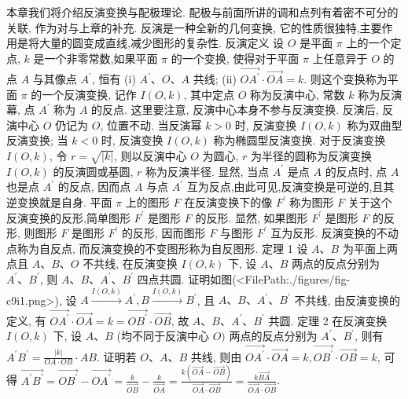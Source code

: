 
本章我们将介绍反演变换与配极理论.
配极与前面所讲的调和点列有着密不可分的关联, 作为对与上章的补充.
反演是一种全新的几何变换, 它的性质很独特,主要作用是将大量的圆变成直线,减少图形的复杂性.
反演定义 设 $O$ 是平面 $\pi$ 上的一个定点, $k$ 是一个非零常数,如果平面 $\pi$ 的一个变换, 使得对于平面 $\pi$ 上任意异于 $O$ 的点 $A$ 与其像点 $A^{\prime}$, 恒有
(i) $A^{\prime} 、 O 、 A$ 共线;
(ii) $\overrightarrow{O A^{\prime}} \cdot \overrightarrow{O A}=k$.
则这个变换称为平面 $\pi$ 的一个反演变换, 记作 $I(O, k)$, 其中定点 $O$ 称为反演中心, 常数 $k$ 称为反演幕, 点 $A^{\prime}$ 称为 $A$ 的反点.
这里要注意, 反演中心本身不参与反演变换.
反演后, 反演中心 $O$ 仍记为 $O$, 位置不动.
当反演幂 $k>0$ 时, 反演变换 $I(O, k)$ 称为双曲型反演变换; 当 $k<0$ 时, 反演变换 $I(O, k)$ 称为椭圆型反演变换.
对于反演变换 $I(O, k)$, 令 $r=\sqrt{|k|}$, 则以反演中心 $O$ 为圆心, $r$ 为半径的圆称为反演变换 $I(O, k)$ 的反演圆或基圆, $r$ 称为反演半径.
显然, 当点 $A^{\prime}$ 是点 $A$ 的反点时, 点 $A$ 也是点 $A^{\prime}$ 的反点, 因而点 $A$ 与点 $A^{\prime}$ 互为反点,由此可见,反演变换是可逆的,且其逆变换就是自身.
平面 $\pi$ 上的图形 $F$ 在反演变换下的像 $F^{\prime}$ 称为图形 $F$ 关于这个反演变换的反形,简单图形 $F^{\prime}$ 是图形 $F$ 的反形.
显然, 如果图形 $F^{\prime}$ 是图形 $F$ 的反形, 则图形 $F$ 是图形 $F^{\prime}$ 的反形, 因而图形 $F$ 与图形 $F^{\prime}$ 互为反形.
反演变换的不动点称为自反点, 而反演变换的不变图形称为自反图形.
定理 1 设 $A 、 B$ 为平面上两点且 $A 、 B 、 O$ 不共线, 在反演变换 $I(O, k)$ 下, 设 $A 、 B$ 两点的反点分别为 $A^{\prime} 、 B^{\prime}$, 则 $A 、 B 、 A^{\prime} 、 B^{\prime}$ 四点共圆.
证明如图(<FilePath:./figures/fig-c9i1.png>), 设 $A \stackrel{I(O, k)}{\rightarrow} A^{\prime}, B \stackrel{I(O, k)}{\rightarrow} B^{\prime}$, 且 $A 、 B 、 A^{\prime} 、 B^{\prime}$ 不共线, 由反演变换的定义, 有 $\overrightarrow{O A^{\prime}} \cdot \overrightarrow{O A}=k=\overrightarrow{O B^{\prime}} \cdot \overrightarrow{O B}$, 故 $A 、 B 、 A^{\prime} 、 B^{\prime}$ 共圆.
定理 2 在反演变换 $I(O, k)$ 下, 设 $A 、 B$ (均不同于反演中心 $O)$ 两点的反点分别为 $A^{\prime} 、 B^{\prime}$, 则有 $A^{\prime} B^{\prime}=\frac{|k|}{O A \cdot O B} \cdot A B$.
证明若 $O 、 A 、 B$ 共线, 则由 $\overrightarrow{O A^{\prime}} \cdot \overrightarrow{O A}=k, \overrightarrow{O B^{\prime}} \cdot \overrightarrow{O B}=k$, 可得 $\overrightarrow{A^{\prime} B^{\prime}}=\overrightarrow{O B^{\prime}}-\overrightarrow{O A^{\prime}}=\frac{k}{\overrightarrow{O B}}-\frac{k}{\overrightarrow{O A}}=\frac{k(\overrightarrow{O A}-\overrightarrow{O B})}{\overrightarrow{O A} \cdot \overrightarrow{O B}}=\frac{k \overrightarrow{B A}}{\overrightarrow{O A} \cdot \overrightarrow{O B}}$.
